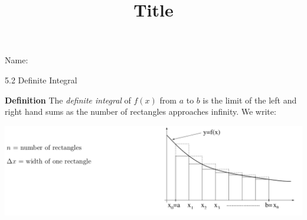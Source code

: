 \documentclass[12pt]{article}
\title{Title}
\begin{document}

 Name:
 \begin{center}\large{5.2 Definite Integral}\end{center}





\begin{tcolorbox}
\textbf{Definition} The \textit{definite integral} of $f(x)$ from $a$ to $b$ is the limit of the left and right hand sums as the number of rectangles approaches infinity. We write:
\vspace{20mm}
\end{tcolorbox}
\includegraphics [scale=.75]{5_2_g2}\\
\end{document}

